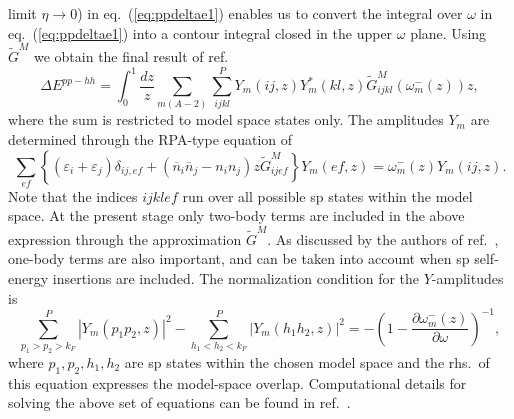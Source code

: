 limit $\eta\rightarrow 0$) in eq.\
(\ref{eq:ppdeltae1}) enables us to
convert the integral over $\omega$ in eq.\ (\ref{eq:ppdeltae1})
into a contour integral closed in the upper $\omega$ plane.
Using $\tilde{G}^M$ we obtain the final result of ref.\
\cite{shk87}
\begin{equation}
       \Delta E^{pp-hh}=
       \int_0^1\frac{dz}{z}
       \sum_{m(A-2)}\sum_{ijkl}^{P}Y_m(ij,z)
       Y_m^*(kl,z)\tilde{G}_{ijkl}^M(\omega_m^-(z))z,
       \label{eq:ppdeltae4}
\end{equation}
where the sum is restricted to model space states only.
The amplitudes $Y_m$ are determined through the RPA-type
equation of
\begin{equation}
   \sum_{ef}\left\{(\varepsilon_i+\varepsilon_j)\delta_{ij,ef}
   +(\overline{n}_i\overline{n}_j-n_in_j)z\tilde{G}_{ijef}^M\right\}
   Y_m(ef,z)=\omega_m^-(z)Y_m(ij,z).
\end{equation}
Note that the indices $ijklef$ run over all
possible sp states within the model space. At the present
stage only two-body terms are included in the above expression
through the approximation $\tilde{G}^M$. As discussed by the authors
of ref.\ \cite{shk87}, one-body terms are also important, and
can be taken into account when sp self-energy insertions are included.
The normalization condition for the $Y$-amplitudes is \cite{shk87}
\begin{equation}
  \sum_{p_1>p_2>k_F}^{P}\left| Y_m(p_1p_2,z)\right|^2
 -\sum_{h_1<h_2<k_F}^{P}\left| Y_m(h_1h_2,z)\right|^2
  =-\left(1-\frac{\partial \omega_m^-(z)}{\partial\omega}\right)^{-1},
\end{equation}
where $p_1,p_2,h_1,h_2$ are sp states within the chosen model space
and the rhs.\ of this equation  expresses the model-space
overlap. Computational details for solving
the above set of equations can be found in ref.\ \cite{shk87}.

